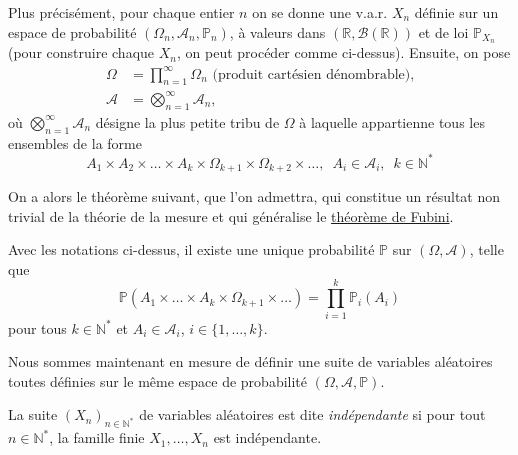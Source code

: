 Plus précisément, pour chaque entier \(n\) on se donne une v.a.r.
\(X_n\) définie sur un espace de probabilité
\((\Omega_n,\mathcal{A}_n,\mathbb{P}_n)\), à valeurs dans
\((\mathbb{R},\mathcal{B}(\mathbb{R}))\) et de loi \(\mathbb{P}_{X_n}\)
(pour construire chaque \(X_n\), on peut procéder comme ci-dessus).
Ensuite, on pose \begin{align*}
\Omega &= \prod_{n=1}^{\infty}\Omega_n \text{        (produit cartésien dénombrable),}\\
\mathcal{A}&= \bigotimes_{n=1}^{\infty}\mathcal{A}_n,
\end{align*} où \(\bigotimes_{n=1}^{\infty}\mathcal{A}_n\) désigne la
plus petite tribu de \(\Omega\) à laquelle appartienne tous les
ensembles de la forme
\[A_1 \times A_2 \times \ldots\times A_k \times \Omega_{k+1} \times \Omega_{k+2} \times \ldots, \,\,\, A_i \in \mathcal{A}_i, \,\,\, k \in \mathbb{N}^\ast\]

On a alors le théorème suivant, que l'on admettra, qui constitue un
résultat non trivial de la théorie de la mesure et qui généralise le
\href{Probabilité\%20III.pdf\%20\#fubiniproba}{théorème de Fubini}.

\begin{theoreme}\label{IV-probaespaceden}

Avec les notations ci-dessus, il existe une unique probabilité
\(\mathbb{P}\) sur \((\Omega,\mathcal{A})\), telle que
\[\mathbb{P}(A_1 \times \ldots\times A_k \times \Omega_{k+1} \times \ldots) =\prod_{i=1}^k \mathbb{P}_i(A_i)\]
pour tous \(k \in \mathbb{N}^{\ast}\) et \(A_i \in \mathcal{A}_i\),
\(i \in \{1,\ldots,k\}\).
\end{theoreme}

Nous sommes maintenant en mesure de définir une suite de variables
aléatoires toutes définies sur le même espace de probabilité
\((\Omega, \mathcal{A}, \mathbb{P})\).

\begin{definition}\label{IV-suites-de-variables-aluxe9atoires-induxe9pendantes}

La suite \((X_n)_{n\in \mathbb{N}^\ast}\) de variables aléatoires est
dite \emph{indépendante} si pour tout \(n \in \mathbb{N}^\ast\), la
famille finie \(X_1,\ldots,X_n\) est indépendante.
\end{definition}


